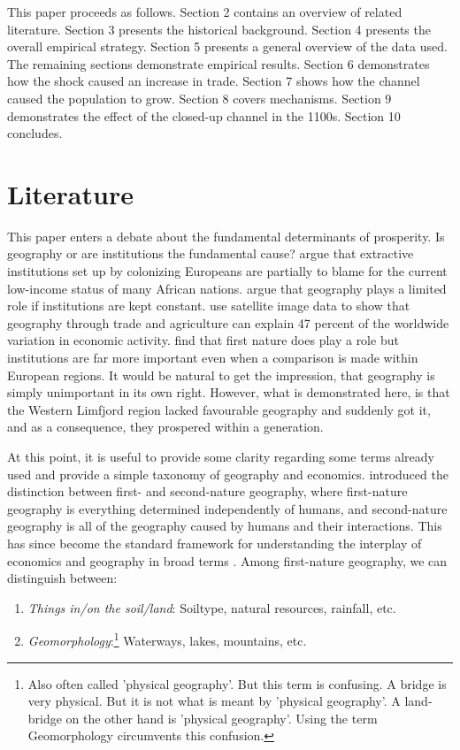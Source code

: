 \documentclass[11pt]{article}
\begin{document}
This paper proceeds as follows. Section 2 contains an overview of related literature. Section 3 presents the historical background. Section 4 presents the overall empirical strategy. Section 5 presents a general overview of the data used. The remaining sections demonstrate empirical results. Section 6 demonstrates how the shock caused an increase in trade. Section 7 shows how the channel caused the population to grow. Section 8 covers mechanisms. Section 9 demonstrates the effect of the closed-up channel in the 1100s. Section 10 concludes. 

\section{Literature}

This paper enters a debate about the fundamental determinants of prosperity. Is geography or are institutions the fundamental cause? \cite{Acemoglu2001} argue that extractive institutions set up by colonizing Europeans are partially to blame for the current low-income status of many African nations. \cite{rodrik2004institutions} argue that geography plays a limited role if institutions are kept constant. \cite{Henderson2018satelite} use satellite image data to show that geography through trade and agriculture can explain 47 percent of the worldwide variation in economic activity. \cite{Ketterer2018} find that first nature does play a role but institutions are far more important even when a comparison is made within European regions. It would be natural to get the impression, that geography is simply unimportant in its own right. However, what is demonstrated here, is that the Western Limfjord region lacked favourable geography and suddenly got it, and as a consequence, they prospered within a generation. 

At this point, it is useful to provide some clarity regarding some terms already used and provide a simple taxonomy of geography and economics. \cite{cronon1992nature} introduced the distinction between first- and second-nature geography, where first-nature geography is everything determined independently of humans, and second-nature geography is all of the geography caused by humans and their interactions. This has since become the standard framework for understanding the interplay of economics and geography in broad terms \citep{Caruana-Galizia_Okubo_Wolf_2021}. Among first-nature geography, we can distinguish between:
\begin{enumerate}
    \item \textit{Things in/on the soil/land}: Soiltype, natural resources, rainfall, etc.
    \item \textit{Geomorphology}:\footnote{Also often called 'physical geography'. But this term is confusing. A bridge is very physical. But it is not what is meant by 'physical geography'. A land-bridge on the other hand is 'physical geography'. Using the term Geomorphology circumvents this confusion.} Waterways, lakes, mountains, etc.
\end{enumerate}
\end{document}
